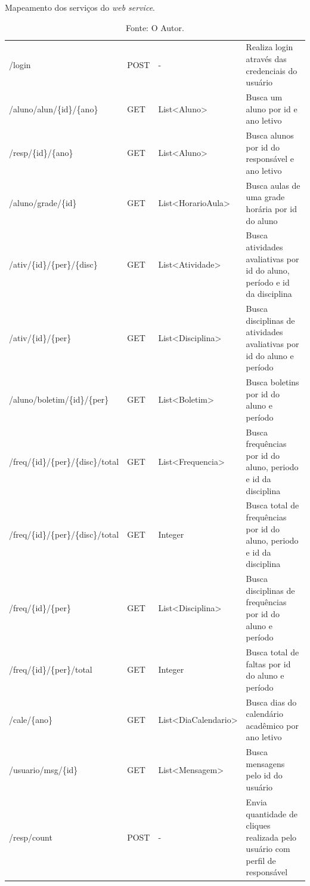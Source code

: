 \begin{table}[H]
    \small
	\centering
	\caption{Mapeamento dos serviços do \textit{web service}.}
	\renewcommand{\arraystretch}{1.5}
	\begin{tabular}{>{\centering}m{1.8in} >{\centering}m{0.5in} >{\centering}m{1.35in} >{\centering\arraybackslash}m{1.95in}}
	    \hline
		\multicolumn{1}{c|}{\textbf{URI}} 
		& \multicolumn{1}{c|}{\textbf{Método}}
		& \multicolumn{1}{c|}{\textbf{Retorno}}
		& \multicolumn{1}{c}{\textbf{Descrição}}\\
		\hline
		/login & POST & - & Realiza login através das credenciais do usuário \\
		/aluno/alun/\{id\}/\{ano\} & GET & List<Aluno> & Busca um aluno por id e ano letivo \\
		/resp/\{id\}/\{ano\} & GET & List<Aluno> & Busca alunos por id do responsável e ano letivo \\
		/aluno/grade/\{id\} & GET & List<HorarioAula> & Busca aulas de uma grade horária por id do aluno \\
		/ativ/\{id\}/\{per\}/\{disc\} & GET & List<Atividade> & Busca atividades avaliativas por id do aluno, período e id da disciplina \\
		/ativ/\{id\}/\{per\} & GET & List<Disciplina> & Busca disciplinas de atividades avaliativas por id do aluno e período \\
		/aluno/boletim/\{id\}/\{per\} & GET & List<Boletim> & Busca boletins por id do aluno e período \\
		/freq/\{id\}/\{per\}/\{disc\}/total & GET & List<Frequencia> & Busca frequências por id do aluno, periodo e id da disciplina \\
		/freq/\{id\}/\{per\}/\{disc\}/total & GET & Integer & Busca total de frequências por id do aluno, periodo e id da disciplina \\
		/freq/\{id\}/\{per\} & GET & List<Disciplina> & Busca disciplinas de frequências por id do aluno e período \\
		/freq/\{id\}/\{per\}/total & GET & Integer & Busca total de faltas por id do aluno e período \\
		/cale/\{ano\} & GET & List<DiaCalendario> & Busca dias do calendário acadêmico por ano letivo \\
		/usuario/msg/\{id\} & GET & List<Mensagem> & Busca mensagens pelo id do usuário \\
		/resp/count & POST & - & Envia quantidade de cliques realizada pelo usuário com perfil de responsável \\
		\hline
	\end{tabular}
	\label{tabela:webservice_servicos}
	\captionsetup{singlelinecheck = false, format= hang, justification=raggedright, font=footnotesize, labelsep=space}
	\caption*{\footnotesize Fonte: O Autor.}
\end{table}

